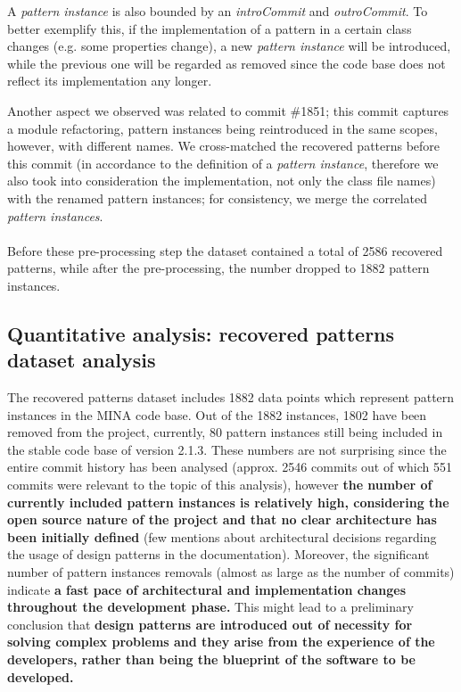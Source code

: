 A \textit{pattern instance} is also bounded by an \textit{introCommit} and \textit{outroCommit}. To better exemplify this, if the implementation of a pattern in a certain class changes (e.g. some properties change), a new \textit{pattern instance} will be introduced, while the previous one will be regarded as removed since the code base does not reflect its implementation any longer.

Another aspect we observed was related to commit \#1851; this commit captures a module refactoring, pattern instances being reintroduced in the same scopes, however, with different names.
We cross-matched the recovered patterns before this commit (in accordance to the definition of a \textit{pattern instance}, therefore we also took into consideration the implementation, not only the class file names) with the renamed pattern instances; for consistency, we merge the correlated \textit{pattern instances}.\\\\
Before these pre-processing step the dataset contained a total of 2586 recovered patterns, while after the pre-processing, the number dropped to 1882 pattern instances.

\subsection{Quantitative analysis: recovered patterns dataset analysis}
The recovered patterns dataset includes 1882 data points which represent pattern instances in the MINA code base. Out of the 1882 instances, 1802 have been removed from the project, currently, 80 pattern instances still being included in the stable code base of version 2.1.3. These numbers are not surprising since the entire commit history has been analysed (approx. 2546 commits out of which 551 commits were relevant to the topic of this analysis), however \textbf{the number of currently included pattern instances is relatively high, considering the open source nature of the project and that no clear architecture has been initially defined} (few mentions about architectural decisions regarding the usage of design patterns in the documentation). Moreover, the significant number of pattern instances removals (almost as large as the number of commits) indicate \textbf{a fast pace of architectural and implementation changes throughout the development phase.} This might lead to a preliminary conclusion that \textbf{design patterns are introduced out of necessity for solving complex problems and they arise from the experience of the developers, rather than being the blueprint of the software to be developed.}

